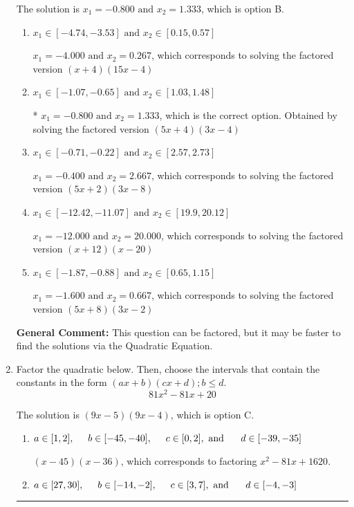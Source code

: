 \documentclass{extbook}[14pt]
\newcommand{\litem}[1]{\item #1

\rule{\textwidth}{0.4pt}}
\begin{document}
\begin{enumerate}
{The solution is \( x_1 = -0.800 \text{ and } x_2 = 1.333 \), which is option B.\begin{enumerate}[label=\Alph*.]
\item \( x_1 \in [-4.74, -3.53] \text{ and } x_2 \in [0.15, 0.57] \)

$x_1 = -4.000 \text{ and } x_2 = 0.267$, which corresponds to solving the factored version $(x + 4)(15x -4)$
\item \( x_1 \in [-1.07, -0.65] \text{ and } x_2 \in [1.03, 1.48] \)

* $x_1 = -0.800 \text{ and } x_2 = 1.333$, which is the correct option. Obtained by solving the factored version $(5x + 4)(3x -4)$
\item \( x_1 \in [-0.71, -0.22] \text{ and } x_2 \in [2.57, 2.73] \)

$x_1 = -0.400 \text{ and } x_2 = 2.667$, which corresponds to solving the factored version $(5x + 2)(3x -8)$
\item \( x_1 \in [-12.42, -11.07] \text{ and } x_2 \in [19.9, 20.12] \)

$x_1 = -12.000 \text{ and } x_2 = 20.000$, which corresponds to solving the factored version $(x + 12)(x -20)$
\item \( x_1 \in [-1.87, -0.88] \text{ and } x_2 \in [0.65, 1.15] \)

$x_1 = -1.600 \text{ and } x_2 = 0.667$, which corresponds to solving the factored version $(5x + 8)(3x -2)$
\end{enumerate}

\textbf{General Comment:} This question can be factored, but it may be faster to find the solutions via the Quadratic Equation.
}
\litem{
Factor the quadratic below. Then, choose the intervals that contain the constants in the form $(ax+b)(cx+d); b \leq d.$
\[ 81x^{2} -81 x + 20 \]

The solution is \( (9x -5)(9x -4) \), which is option C.\begin{enumerate}[label=\Alph*.]
\item \( a \in [1, 2], \hspace*{5mm} b \in [-45, -40], \hspace*{5mm} c \in [0, 2], \text{ and } \hspace*{5mm} d \in [-39, -35] \)

 $(x -45)(x -36)$, which corresponds to factoring $x^{2} -81 x + 1620$.
\item \( a \in [27, 30], \hspace*{5mm} b \in [-14, -2], \hspace*{5mm} c \in [3, 7], \text{ and } \hspace*{5mm} d \in [-4, -3] \)


\end{enumerate}}
\end{enumerate}
\end{document}
